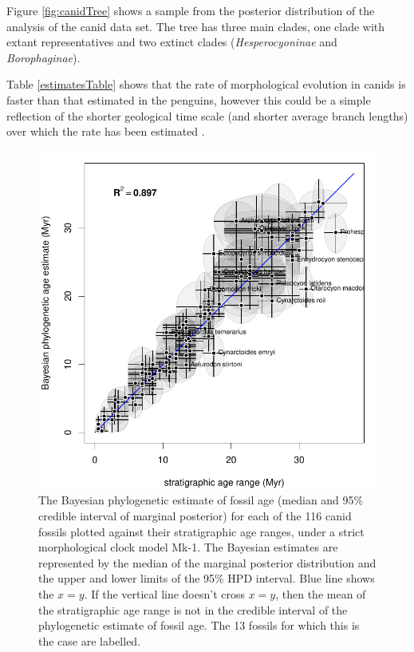 \documentclass[11pt]{article}
\newcommand{\Mstrict}{{Mk-1}}
\newcommand{\ncanidfossils}{{116}}
\begin{document}
Figure \ref{fig:canidTree} shows a sample from the posterior distribution of the analysis of the canid data set. The tree has three main clades, one clade with extant representatives and two extinct clades ({\it Hesperocyoninae} and {\it Borophaginae}). 

Table \ref{estimatesTable} shows that the rate of morphological evolution in canids is faster than that estimated in the penguins, however this could be a simple reflection of the shorter geological time scale (and shorter average branch lengths) over which the rate has been estimated \cite{Gingerich1993}.

\begin{figure}
\includegraphics{canids/stratRanges/1c_phyloAgeVsGeoAge.pdf}
\caption{\label{fig:canidMorphVsGeo}
The Bayesian phylogenetic estimate of fossil age (median and 95\% credible interval of marginal posterior) for each of the \ncanidfossils{} canid fossils plotted against their stratigraphic age ranges, under a strict morphological clock model \Mstrict{}. 
The Bayesian estimates are represented by the median of the marginal posterior distribution and the upper and lower limits of the 95\% HPD interval. Blue line shows the $x=y$. 
If the vertical line doesn't cross $x=y$, then the mean of the stratigraphic age range is not in the credible interval of the phylogenetic estimate of fossil age. The 13 fossils for which this is the case are labelled.}
\end{figure}
\end{document}
